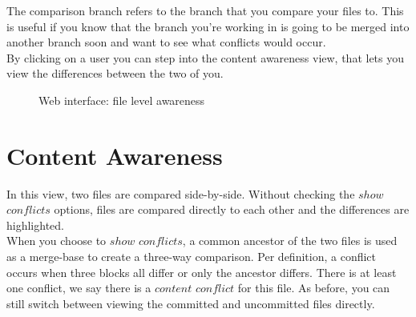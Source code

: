 The comparison branch refers to the branch that you compare your files to. This is useful if you know that the branch you're working in is going to be merged into another branch soon and want to see what conflicts would occur. \\

By clicking on a user you can step into the content awareness view, that lets you view the differences between the two of you.



\begin{figure}[h!]
  \centering
  \caption{Web interface: file level awareness}
  \label{fig:filelevel}
\end{figure}



\section{Content Awareness}

In this view, two files are compared side-by-side. Without checking the $show$ $conflicts$ options, files are compared directly to each other and the differences are highlighted. \\

When you choose to $show$ $conflicts$, a common ancestor of the two files is used as a merge-base to create a three-way comparison. Per definition, a conflict occurs when three blocks all differ or only the ancestor differs. There is at least one conflict, we say there is a $content$ $conflict$ for this file. As before, you can still switch between viewing the committed and uncommitted files directly.



